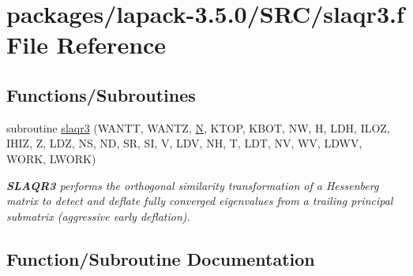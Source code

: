 \hypertarget{slaqr3_8f}{}\section{packages/lapack-\/3.5.0/\+S\+R\+C/slaqr3.f File Reference}
\label{slaqr3_8f}
\subsection*{Functions/\+Subroutines}
\begin{DoxyCompactItemize}
\item 
subroutine \hyperlink{slaqr3_8f_aa307109641dfead545ecac4e924320cb}{slaqr3} (W\+A\+N\+T\+T, W\+A\+N\+T\+Z, \hyperlink{polmisc_8c_a0240ac851181b84ac374872dc5434ee4}{N}, K\+T\+O\+P, K\+B\+O\+T, N\+W, H, L\+D\+H, I\+L\+O\+Z, I\+H\+I\+Z, Z, L\+D\+Z, N\+S, N\+D, S\+R, S\+I, V, L\+D\+V, N\+H, T, L\+D\+T, N\+V, W\+V, L\+D\+W\+V, W\+O\+R\+K, L\+W\+O\+R\+K)
\begin{DoxyCompactList}\small\item\em {\bfseries S\+L\+A\+Q\+R3} performs the orthogonal similarity transformation of a Hessenberg matrix to detect and deflate fully converged eigenvalues from a trailing principal submatrix (aggressive early deflation). \end{DoxyCompactList}\end{DoxyCompactItemize}


\subsection{Function/\+Subroutine Documentation}
\hypertarget{slaqr3_8f_aa307109641dfead545ecac4e924320cb}{}
